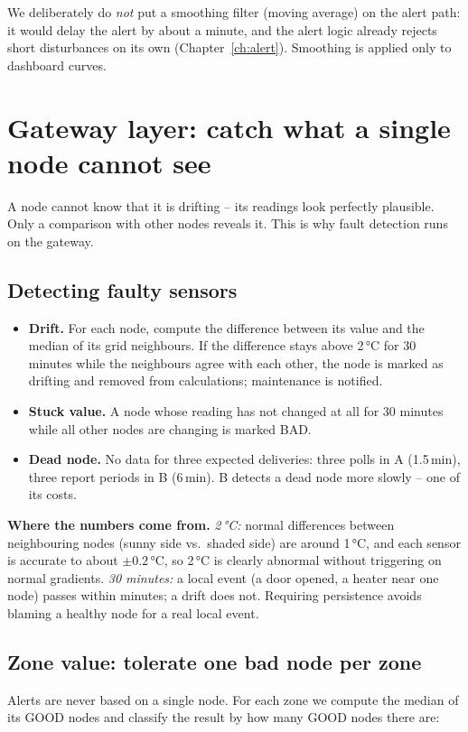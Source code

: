 \documentclass[11pt,a4paper]{report}
\newcommand{\why}[1]{\par\noindent\colorbox{gray!10}{\parbox{\dimexpr\linewidth-2\fboxsep}{\small\textbf{Where the numbers come from.} #1}}\par}
\begin{document}
We deliberately do \emph{not} put a smoothing filter (moving average) on the alert path: it would delay the alert by about a minute, and the alert logic already rejects short disturbances on its own (Chapter~\ref{ch:alert}). Smoothing is applied only to dashboard curves.

\section{Gateway layer: catch what a single node cannot see}
A node cannot know that it is drifting -- its readings look perfectly plausible. Only a comparison with other nodes reveals it. This is why fault detection runs on the gateway.

\subsection{Detecting faulty sensors}
\begin{itemize}
  \item \textbf{Drift.} For each node, compute the difference between its value and the median of its grid neighbours. If the difference stays above 2\,°C for 30 minutes while the neighbours agree with each other, the node is marked as drifting and removed from calculations; maintenance is notified.
  \item \textbf{Stuck value.} A node whose reading has not changed at all for 30 minutes while all other nodes are changing is marked BAD.
  \item \textbf{Dead node.} No data for three expected deliveries: three polls in A (1.5\,min), three report periods in B (6\,min). B detects a dead node more slowly -- one of its costs.
\end{itemize}

\why{\emph{2\,°C:} normal differences between neighbouring nodes (sunny side vs.\ shaded side) are around 1\,°C, and each sensor is accurate to about $\pm0.2$\,°C, so 2\,°C is clearly abnormal without triggering on normal gradients. \emph{30 minutes:} a local event (a door opened, a heater near one node) passes within minutes; a drift does not. Requiring persistence avoids blaming a healthy node for a real local event.}

\subsection{Zone value: tolerate one bad node per zone}\label{sec:zone}
Alerts are never based on a single node. For each zone we compute the median of its GOOD nodes and classify the result by how many GOOD nodes there are:
\end{document}
